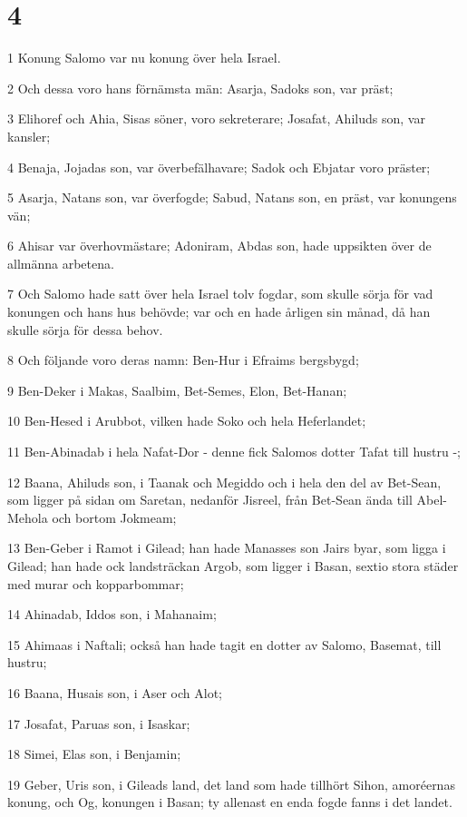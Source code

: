 \chapter{4}

\par 1 Konung Salomo var nu konung över hela Israel.
\par 2 Och dessa voro hans förnämsta män: Asarja, Sadoks son, var präst;
\par 3 Elihoref och Ahia, Sisas söner, voro sekreterare; Josafat, Ahiluds son, var kansler;
\par 4 Benaja, Jojadas son, var överbefälhavare; Sadok och Ebjatar voro präster;
\par 5 Asarja, Natans son, var överfogde; Sabud, Natans son, en präst, var konungens vän;
\par 6 Ahisar var överhovmästare; Adoniram, Abdas son, hade uppsikten över de allmänna arbetena.
\par 7 Och Salomo hade satt över hela Israel tolv fogdar, som skulle sörja för vad konungen och hans hus behövde; var och en hade årligen sin månad, då han skulle sörja för dessa behov.
\par 8 Och följande voro deras namn: Ben-Hur i Efraims bergsbygd;
\par 9 Ben-Deker i Makas, Saalbim, Bet-Semes, Elon, Bet-Hanan;
\par 10 Ben-Hesed i Arubbot, vilken hade Soko och hela Heferlandet;
\par 11 Ben-Abinadab i hela Nafat-Dor - denne fick Salomos dotter Tafat till hustru -;
\par 12 Baana, Ahiluds son, i Taanak och Megiddo och i hela den del av Bet-Sean, som ligger på sidan om Saretan, nedanför Jisreel, från Bet-Sean ända till Abel-Mehola och bortom Jokmeam;
\par 13 Ben-Geber i Ramot i Gilead; han hade Manasses son Jairs byar, som ligga i Gilead; han hade ock landsträckan Argob, som ligger i Basan, sextio stora städer med murar och kopparbommar;
\par 14 Ahinadab, Iddos son, i Mahanaim;
\par 15 Ahimaas i Naftali; också han hade tagit en dotter av Salomo, Basemat, till hustru;
\par 16 Baana, Husais son, i Aser och Alot;
\par 17 Josafat, Paruas son, i Isaskar;
\par 18 Simei, Elas son, i Benjamin;
\par 19 Geber, Uris son, i Gileads land, det land som hade tillhört Sihon, amoréernas konung, och Og, konungen i Basan; ty allenast en enda fogde fanns i det landet.
